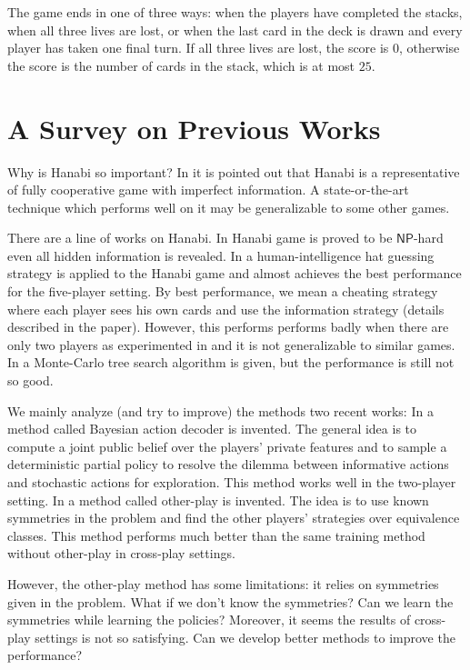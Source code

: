 \documentclass[12pt]{article}
\begin{document}
The game ends in one of three ways: when the players have completed the stacks, when all three lives are lost, or when the last card in the deck is drawn and every player has taken one final turn. If all three lives are lost, the score is $0$, otherwise the score is the number of cards in the stack, which is at most $25$.

\section{A Survey on Previous Works}
Why is Hanabi so important? In \cite{BFC+20} it is pointed out that Hanabi is a representative of fully cooperative game with imperfect information. A state-or-the-art technique which performs well on it may be generalizable to some other games. 

There are a line of works on Hanabi. In \cite{BCD+17} Hanabi game is proved to be $\mathsf{NP}$-hard even all hidden information is revealed. In \cite{CSD+15} a human-intelligence hat guessing strategy is applied to the Hanabi game and almost achieves the best performance for the five-player setting. By best performance, we mean a cheating strategy where each player sees his own cards and use the information strategy (details described in the paper). However, this performs performs badly when there are only two players as experimented in \cite{Bou17} and it is not generalizable to similar games. In \cite{WWB+17} a Monte-Carlo tree search algorithm is given, but the performance is still not so good.

We mainly analyze (and try to improve) the methods two recent works: In \cite{FSH+19} a method called Bayesian action decoder is invented. The general idea is to compute a joint public belief over the players' private features and to sample a deterministic partial policy to resolve the dilemma between informative actions and stochastic actions for exploration. This method works well in the two-player setting. In \cite{HLPF20} a method called other-play is invented. The idea is to use known symmetries in the problem and find the other players' strategies over equivalence classes. This method performs much better than the same training method without other-play in cross-play settings.

However, the other-play method has some limitations: it relies on symmetries given in the problem. What if we don't know the symmetries? Can we learn the symmetries while learning the policies? Moreover, it seems the results of cross-play settings is not so satisfying. Can we develop better methods to improve the performance?
\end{document}
